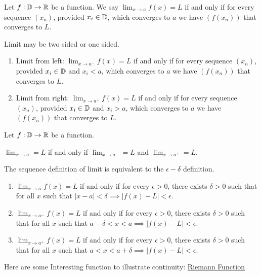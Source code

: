 \documentclass[../note.tex]{subfiles}
\begin{document}
\begin{definition}\label{SequenceDefinitionOfLimit}
	Let $f: \mathbb{D} \rightarrow \mathbb{R}$ be a function. 
	We say $\lim_{x \rightarrow a} f(x)=L$ if and only if for every sequence $(x_n)$, provided $x_i \in \mathbb{D}$, which converges to $a$ we have $(f(x_n))$ that converges to $L$.	
\end{definition}

\begin{definition}
	Limit may be two sided or one sided.
	\begin{enumerate}
	\item Limit from left: $\lim_{x \rightarrow a^-} f(x)=L$ if and only if for every sequence $(x_n)$, provided $x_i \in \mathbb{D}$ and $x_i<a$, which converges to $a$ we have $(f(x_n))$ that converges to $L$.
	\item Limit from right: $\lim_{x \rightarrow a^+} f(x)=L$ if and only if for every sequence $(x_n)$, provided $x_i \in \mathbb{D}$ and $x_i>a$, which converges to $a$ we have $(f(x_n))$ that converges to $L$.
	\end{enumerate}
\end{definition}

\begin{definition} 
\end{definition}

\begin{theorem}
	Let $f: \mathbb{D} \rightarrow \mathbb{R}$ be a function. 

	$\lim_{x \rightarrow a}=L$ if and only if $\lim_{x \rightarrow a^-}=L$ and $\lim_{x \rightarrow a^+}=L$.
\end{theorem}

\begin{theorem}
	The sequence definition of limit is equivalent to the $\epsilon-\delta$ definition.
	\begin{enumerate}
	\item $\lim_{x \rightarrow a} f(x)=L$ if and only if for every $\epsilon > 0$, there exists $\delta > 0$ such that for all $x$ such that $|x-a|<\delta \implies |f(x)-L|<\epsilon$.
	\item $\lim_{x \rightarrow a^-} f(x)=L$ if and only if for every $\epsilon > 0$, there exists $\delta > 0$ such that for all $x$ such that $a-\delta<x<a \implies |f(x)-L|<\epsilon$.
	\item $\lim_{x \rightarrow a^+} f(x)=L$ if and only if for every $\epsilon > 0$, there exists $\delta > 0$ such that for all $x$ such that $a<x<a+\delta \implies |f(x)-L|<\epsilon$.
	\end{enumerate}
\end{theorem}


Here are some Interesting function to illustrate continuity: \hyperlink{RiemannFunction}{Riemann Function}
\end{document}
